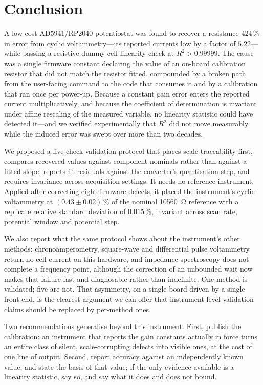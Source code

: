 \section{Conclusion}
\label{sec:conclusion}

A low-cost AD5941/RP2040 potentiostat was found to recover a resistance
$424\,\%$ in error from cyclic voltammetry---its reported currents low by a
factor of $5.22$---while passing a resistive-dummy-cell linearity check at
$R^{2} > 0.99999$. The cause was a single firmware constant declaring the
value of an on-board calibration resistor that did not match the resistor
fitted, compounded by a broken path from the user-facing command to the code
that consumes it and by a calibration that ran once per power-up. Because a
constant gain error enters the reported current multiplicatively, and because
the coefficient of determination is invariant under affine rescaling of the
measured variable, no linearity statistic could have detected it---and we
verified experimentally that $R^{2}$ did not move measurably while the induced
error was swept over more than two decades.

We proposed a five-check validation protocol that places scale traceability
first, compares recovered values against component nominals rather than against
a fitted slope, reports fit residuals against the converter's quantisation step,
and requires invariance across acquisition settings. It needs no reference
instrument. Applied after correcting eight firmware defects, it placed the
instrument's cyclic voltammetry at $(0.43 \pm 0.02)\,\%$ of the nominal
\SI{10560}{\ohm} reference with a replicate relative standard deviation of
$0.015\,\%$, invariant across scan rate, potential window and potential step.

We also report what the same protocol shows about the instrument's other
methods: chronoamperometry, square-wave and differential pulse voltammetry
return no cell current on this hardware, and impedance spectroscopy does not
complete a frequency point, although the correction of an unbounded wait now
makes that failure fast and diagnosable rather than indefinite. One method is
validated; five are not. That asymmetry, on a single board driven by a single
front end, is the clearest argument we can offer that instrument-level
validation claims should be replaced by per-method ones.

Two recommendations generalise beyond this instrument. First, publish the
calibration: an instrument that reports the gain constants actually in force
turns an entire class of silent, scale-corrupting defects into visible ones, at
the cost of one line of output. Second, report accuracy against an independently
known value, and state the basis of that value; if the only evidence available
is a linearity statistic, say so, and say what it does and does not bound.

